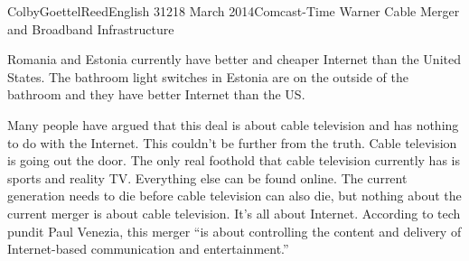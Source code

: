 \documentclass[12pt]{article}
\begin{document}
\begin{mla}{Colby}{Goettel}{Reed}{English 312}{18 March 2014}{Comcast-Time Warner Cable Merger and Broadband Infrastructure}
\begin{figure}
\end{figure}

Romania and Estonia currently have better and cheaper Internet than the United States. The bathroom light switches in Estonia are on the outside of the bathroom and they have better Internet than the US.



Many people have argued that this deal is about cable television and has nothing to do with the Internet. This couldn't be further from the truth. Cable television is going out the door. The only real foothold that cable television currently has is sports and reality TV. Everything else can be found online. The current generation needs to die before cable television can also die, but nothing about the current merger is about cable television. It's all about Internet. According to tech pundit Paul Venezia, this merger ``is about controlling the content and delivery of Internet-based communication and entertainment.''


\end{mla}
\end{document}
